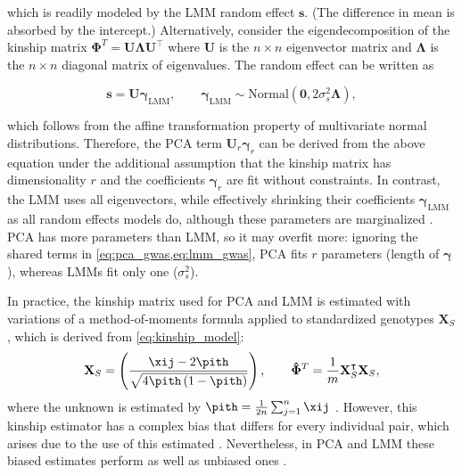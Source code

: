\documentclass[11pt]{article}
\begin{document}
\begin{linenumbers}
which is readily modeled by the LMM random effect $\mathbf{s}$.
(The difference in mean is absorbed by the intercept.)
Alternatively, consider the eigendecomposition of the kinship matrix $\mathbf{\Phi}^T = \mathbf{U} \mathbf{\Lambda} \mathbf{U}^\intercal$ where $\mathbf{U}$ is the $n \times n$ eigenvector matrix and $\mathbf{\Lambda}$ is the $n \times n$ diagonal matrix of eigenvalues.
The random effect can be written as
\begin{linenomath*}
$$
\mathbf{s} = \mathbf{U} \boldsymbol{\gamma}_\text{LMM},
\quad\quad
\boldsymbol{\gamma}_\text{LMM}
\sim \text{Normal}( \mathbf{0}, 2 \sigma_s^2 \boldsymbol{\Lambda})
,
$$
\end{linenomath*}
which follows from the affine transformation property of multivariate normal distributions.
Therefore, the PCA term $\mathbf{U}_r \boldsymbol{\gamma}_r$ can be derived from the above equation under the additional assumption that the kinship matrix has dimensionality $r$ and the coefficients $\boldsymbol{\gamma}_r$ are fit without constraints.
In contrast, the LMM uses all eigenvectors, while effectively shrinking their coefficients $\boldsymbol{\gamma}_\text{LMM}$ as all random effects models do, although these parameters are marginalized \citep{astle_population_2009, janss_inferences_2012, hoffman_correcting_2013, zhang_principal_2015}.
PCA has more parameters than LMM, so it may overfit more: ignoring the shared terms in \cref{eq:pca_gwas,eq:lmm_gwas}, PCA fits $r$ parameters (length of $\boldsymbol{\gamma}$), whereas LMMs fit only one ($\sigma^2_s$).

In practice, the kinship matrix used for PCA and LMM is estimated with variations of a method-of-moments formula applied to standardized genotypes $\mathbf{X}_S$, which is derived from \cref{eq:kinship_model}:
\begin{equation}
  \label{eq:kinship_std}
  \mathbf{X}_S
  =
  \left(
    \frac{
      \xij - 2 \pith
    }{
      \sqrt{4 \pith \left( 1 - \pith \right)}
    }
  \right)
  ,
  \quad\quad
  \mathbf{\hat{\Phi}}^T
  =
  \frac{1}{m}
  \mathbf{X}_S^\intercal
  \mathbf{X}_S
  ,
\end{equation}
where the unknown \pit is estimated by
$
\pith = \frac{1}{2n} \sum_{j = 1}^n \xij
$
\citep{price_principal_2006, kang_efficient_2008, kang_variance_2010, yang_gcta:_2011, zhou_genome-wide_2012, yang_advantages_2014, loh_efficient_2015, sul_population_2018, zhou_efficiently_2018}.
However, this kinship estimator has a complex bias that differs for every individual pair, which arises due to the use of this estimated \pith \citep{ochoa_estimating_2021, ochoa_new_2019}.
Nevertheless, in PCA and LMM these biased estimates perform as well as unbiased ones \citep{hou_genetic_2023}.


\end{linenumbers}
\end{document}
